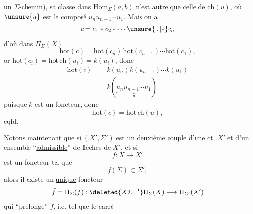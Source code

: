 un $\Sigma$-chemin),  sa classe dans $\mathrm{Hom}_\Sigma(a,b)$ n'est autre que celle de $\mathrm{ch}(u)$, où $\unsure{u}$ est le composé $u_nu_{n-1}\cdots u_1$. Mais on a
\[c=c_1*c_2*\cdots\unsure{\,.\,|*}c_n\]
d'où dans $\Pi_\Sigma(X)$
\[\mathrm{hot}(c)=\mathrm{hot}(c_n)\,\mathrm{hot}(c_{n-1})\cdots\mathrm{hot}(c_1),\]
or $\mathrm{hot}(c_i)=\mathrm{hot}\,\mathrm{ch}(u_i)=k(u_i)$, donc
\[\begin{aligned}\mathrm{hot}(c)&=k(u_n)k(u_{n-1})\cdots k(u_1)\\
&=k(\underbrace{u_nu_{n-1}\cdots u_1}_{u})\end{aligned}\]
puisque $k$ est un foncteur, \deleted{\unsure{$=$}} donc
\[\mathrm{hot}(c)=\mathrm{hot}\,\mathrm{ch}(u),\]
cqfd.

Notons maintenant que si $(X',\Sigma')$ est un deuxième couple d'une ct. $X'$ et d'un ensemble ``\uline{admissible}'' de flèches de $X'$, et si
\[f:X\longrightarrow X'\]
est un foncteur tel que
\[f(\Sigma)\subset\Sigma',\]
alors il existe un \uline{unique} foncteur
\[\bar f=\Pi_\Sigma(f):\deleted{X\Sigma^{-1}}\Pi_\Sigma(X)\longrightarrow\Pi_{\Sigma'}(X')\]
qui ``prolonge'' $f$, i.e. tel que le carré
